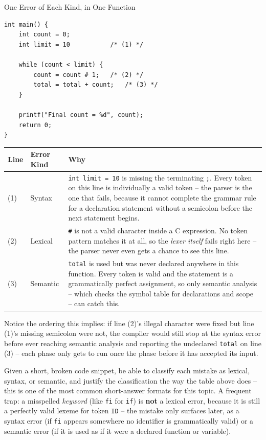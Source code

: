 \documentclass[full-course-notes.tex]{subfiles}
\begin{document}
\begin{examplebox}{One Error of Each Kind, in One Function}
\begin{verbatim}
int main() {
    int count = 0;
    int limit = 10           /* (1) */

    while (count < limit) {
        count = count # 1;   /* (2) */
        total = total + count;   /* (3) */
    }

    printf("Final count = %d", count);
    return 0;
}
\end{verbatim}
\begin{center}
\renewcommand{\arraystretch}{1.3}
\begin{tabularx}{\textwidth}{@{}l l X@{}}
\toprule
\textbf{Line} & \textbf{Error Kind} & \textbf{Why} \\
\midrule
(1) & Syntax & \texttt{int limit = 10} is missing the terminating \texttt{;}. Every token on
this line is individually a valid token -- the parser is the one that fails, because it cannot
complete the grammar rule for a declaration statement without a semicolon before the next
statement begins. \\
(2) & Lexical & \texttt{\#} is not a valid character inside a C expression. No token pattern
matches it at all, so the \emph{lexer itself} fails right here -- the parser never even gets a
chance to see this line. \\
(3) & Semantic & \texttt{total} is used but was never declared anywhere in this function. Every
token is valid and the statement is a grammatically perfect assignment, so only semantic
analysis -- which checks the symbol table for declarations and scope -- can catch this. \\
\bottomrule
\end{tabularx}
\end{center}
Notice the ordering this implies: if line (2)'s illegal character were fixed but line (1)'s
missing semicolon were not, the compiler would still stop at the syntax error before ever
reaching semantic analysis and reporting the undeclared \texttt{total} on line (3) -- each phase
only gets to run once the phase before it has accepted its input.
\end{examplebox}

\begin{examfocus}
Given a short, broken code snippet, be able to classify each mistake as lexical, syntax, or
semantic, and justify the classification the way the table above does -- this is one of the most
common short-answer formats for this topic. A frequent trap: a misspelled \emph{keyword} (like
\texttt{fi} for \texttt{if}) is \textbf{not} a lexical error, because it is still a perfectly
valid lexeme for token \texttt{ID} -- the mistake only surfaces later, as a syntax error (if
\texttt{fi} appears somewhere no identifier is grammatically valid) or a semantic error (if it is
used as if it were a declared function or variable).
\end{examfocus}
\end{document}
